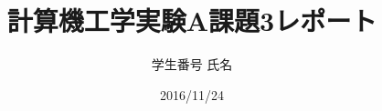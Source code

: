 \documentclass[a4paper]{jarticle}
\title{計算機工学実験A課題3レポート}
\author{学生番号 氏名}
\date{2016/11/24}
\begin{document}
\maketitle

\end{document}
